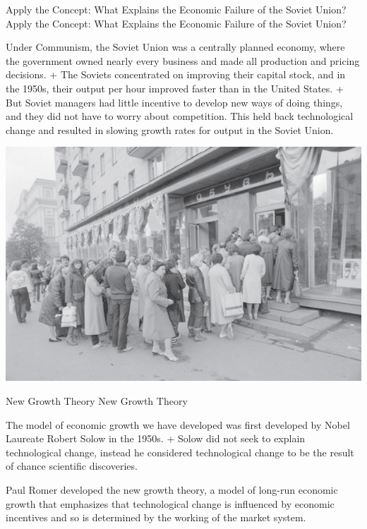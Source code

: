 \documentclass[
  12pt,
  ignorenonframetext,
]{beamer}
\begin{document}
\begin{frame}{Apply the Concept: What Explains the Economic Failure of
the Soviet Union?}
\protect\hypertarget{apply-the-concept-what-explains-the-economic-failure-of-the-soviet-union}{}
Apply the Concept: What Explains the Economic Failure of the Soviet
Union?

Under Communism, the Soviet Union was a centrally planned economy, where
the government owned nearly every business and made all production and
pricing decisions. + The Soviets concentrated on improving their capital
stock, and in the 1950s, their output per hour improved faster than in
the United States. + But Soviet managers had little incentive to develop
new ways of doing things, and they did not have to worry about
competition. This held back technological change and resulted in slowing
growth rates for output in the Soviet Union.

\includegraphics[width=\textwidth,height=0.99\textheight]{imgs3/img_slide23a.png}
\end{frame}

\begin{frame}{New Growth Theory}
\protect\hypertarget{new-growth-theory}{}
New Growth Theory

The model of economic growth we have developed was first developed by
Nobel Laureate Robert Solow in the 1950s. + Solow did not seek to
explain technological change, instead he considered technological change
to be the result of chance scientific discoveries.

Paul Romer developed the new growth theory, a model of long-run economic
growth that emphasizes that technological change is influenced by
economic incentives and so is determined by the working of the market
system.
\end{frame}
\end{document}
